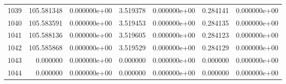 \begin{tabular}{rrrrrrr}
1039 & 105.581348 &  0.000000e+00 &  3.519378 &  0.000000e+00 &    0.284141 &  0.000000e+00 \\
1040 & 105.583591 &  0.000000e+00 &  3.519453 &  0.000000e+00 &    0.284135 &  0.000000e+00 \\
1041 & 105.588136 &  0.000000e+00 &  3.519605 &  0.000000e+00 &    0.284123 &  0.000000e+00 \\
1042 & 105.585868 &  0.000000e+00 &  3.519529 &  0.000000e+00 &    0.284129 &  0.000000e+00 \\
1043 &   0.000000 &  0.000000e+00 &  0.000000 &  0.000000e+00 &    0.000000 &  0.000000e+00 \\
1044 &   0.000000 &  0.000000e+00 &  0.000000 &  0.000000e+00 &    0.000000 &  0.000000e+00 \\
\bottomrule
\end{tabular}
